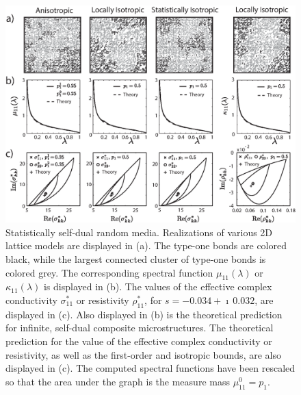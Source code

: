 \documentclass{cmslatex}
\begin{document}
%
%
\begin{figure}[t]
  \centerline{\includegraphics[scale=0.69]{A_Duality_RRN_11.eps}}
\caption{Statistically self-dual random media. Realizations of various 
  2D lattice models are displayed in (a). The type-one
  bonds are colored black, while the largest connected cluster of
  type-one bonds is colored grey. The corresponding spectral function
  $\mu_{11}(\lambda)$ or $\kappa_{11}(\lambda)$ is displayed in (b). The values of the
  effective complex conductivity $\sigma^*_{11}$ or resistivity $\rho^*_{11}$,
  for $s=-0.034+\imath\,0.032$, are displayed in (c). Also displayed in
  (b) is the theoretical prediction for infinite, self-dual composite
  microstructures. The theoretical prediction for 
  the value of the effective complex conductivity or resistivity, as
  well as the first-order and isotropic bounds, are also displayed in
  (c). The computed spectral functions have been rescaled so that the
  area under the graph is the measure mass $\mu^0_{11}=p_1$.                
        }
\label{fig:Duality_RRN_11}
\end{figure}
%
\end{document}
